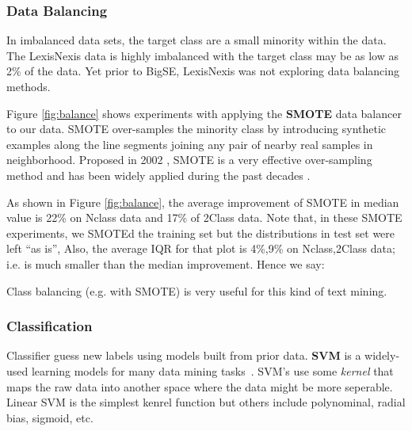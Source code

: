 \documentclass{sig-alternate-05-2015}
\theoremstyle{break}
\begin{document}
\subsubsection{Data Balancing}
\label{sect:Data Balancing}

In imbalanced data sets, the target class are a small minority within the data.
The LexisNexis data is highly imbalanced with the target class may be as low as 2\% of the
data. Yet prior to BigSE, LexisNexis was not exploring data balancing methods.

Figure \ref{fig:balance} shows  experiments with applying the \textbf{SMOTE} data
balancer to our data.
 SMOTE over-samples the minority class by introducing synthetic examples along the line segments joining any pair of nearby real samples in neighborhood.  Proposed in 2002 \cite{chawla2002smote}, SMOTE is a very effective over-sampling method and has been widely applied during the past decades \cite{han2005borderline,bunkhumpornpat2009safe,luengo2011addressing}. 

 
As shown in Figure \ref{fig:balance}, the average improvement of SMOTE in median value is 22\% on Nclass data and 17\% of 2Class data. Note that, in these SMOTE experiments,
we SMOTEd the training set but the distributions in test set were left ``as is'',
Also, the average IQR for that plot is  4\%,9\% on Nclass,2Class data; i.e. is much smaller than the median
improvement. Hence we say:
\begin{lesson}
Class balancing (e.g. with SMOTE) is very useful for this kind of text mining.
\end{lesson}


\subsubsection{Classification}

Classifier guess new labels using models built from prior data.
\textbf{SVM} is a widely-used learning models for  many data mining 
tasks~\cite{joachims2006training,moharanatag}. SVM's use
some {\em kernel} that maps the raw data into another space where the data might be more
seperable. 
Linear SVM is the simplest kenrel function but others include polynominal,
radial bias, sigmoid, etc.
 
\end{document}
